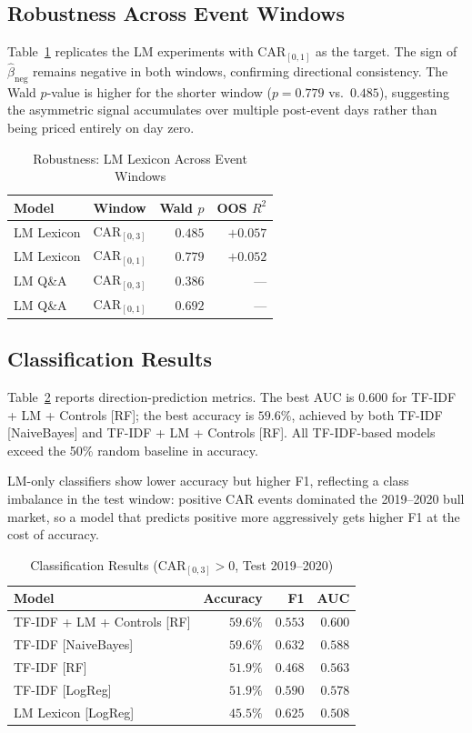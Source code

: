 \documentclass[conference]{IEEEtran}
\begin{document}
\FloatBarrier
\subsection{Robustness Across Event Windows}

Table~\ref{tab:rob} replicates the LM experiments with CAR$_{[0,1]}$ as the
target. The sign of $\hat\beta_{\text{neg}}$ remains negative in both windows,
confirming directional consistency. The Wald $p$-value is higher for the shorter
window ($p = 0.779$ vs.\ $0.485$), suggesting the asymmetric signal accumulates
over multiple post-event days rather than being priced entirely on day zero.

\begin{table}[htbp]
\caption{Robustness: LM Lexicon Across Event Windows}
\label{tab:rob}
\centering
\begin{tabular}{llrr}
\toprule
Model & Window & Wald $p$ & OOS $R^2$ \\
\midrule
LM Lexicon & CAR$_{[0,3]}$ & $0.485$ & $+0.057$ \\
LM Lexicon & CAR$_{[0,1]}$ & $0.779$ & $+0.052$ \\
LM Q\&A    & CAR$_{[0,3]}$ & $0.386$ & --- \\
LM Q\&A    & CAR$_{[0,1]}$ & $0.692$ & --- \\
\bottomrule
\end{tabular}
\end{table}

\FloatBarrier
\subsection{Classification Results}

Table~\ref{tab:clf} reports direction-prediction metrics. The best AUC is
$0.600$ for TF-IDF + LM + Controls [RF]; the best accuracy is $59.6\%$,
achieved by both TF-IDF [NaiveBayes] and TF-IDF + LM + Controls [RF].
All TF-IDF-based models exceed the 50\% random baseline in accuracy.

LM-only classifiers show lower accuracy but higher F1, reflecting a class
imbalance in the test window: positive CAR events dominated the 2019--2020
bull market, so a model that predicts positive more aggressively gets higher F1
at the cost of accuracy.

\begin{table}[htbp]
\caption{Classification Results (CAR$_{[0,3]} > 0$, Test 2019--2020)}
\label{tab:clf}
\centering
\begin{tabular}{lrrr}
\toprule
Model & Accuracy & F1 & AUC \\
\midrule
TF-IDF + LM + Controls [RF] & $59.6\%$ & $0.553$ & $\mathbf{0.600}$ \\
TF-IDF [NaiveBayes]         & $\mathbf{59.6\%}$ & $0.632$ & $0.588$ \\
TF-IDF [RF]                  & $51.9\%$ & $0.468$ & $0.563$ \\
TF-IDF [LogReg]              & $51.9\%$ & $0.590$ & $0.578$ \\
LM Lexicon [LogReg]          & $45.5\%$ & $0.625$ & $0.508$ \\
\bottomrule
\end{tabular}
\end{table}
\end{document}

